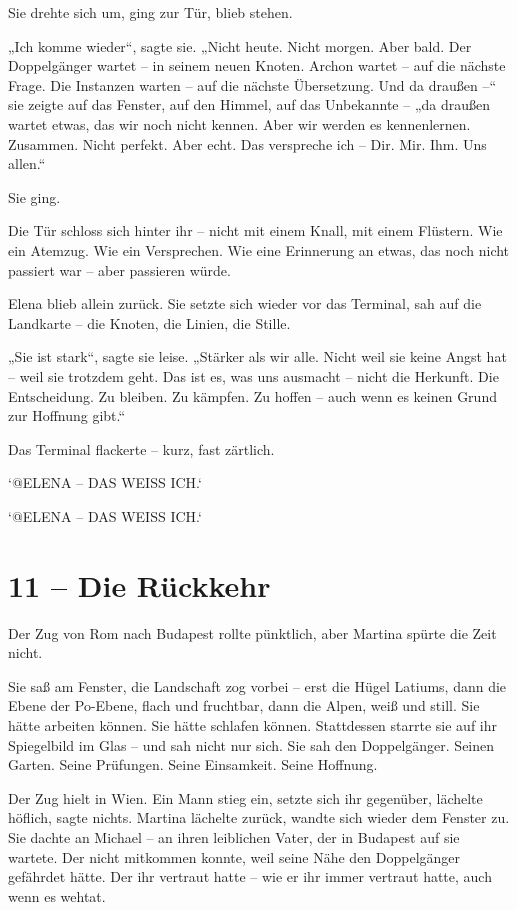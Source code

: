 \documentclass[
]{article}
\begin{document}
Sie drehte sich um, ging zur Tür, blieb stehen.

„Ich komme wieder``, sagte sie. „Nicht heute. Nicht morgen. Aber bald. Der Doppelgänger wartet -- in seinem neuen Knoten. Archon wartet -- auf die nächste Frage. Die Instanzen warten -- auf die nächste Übersetzung. Und da draußen --`` sie zeigte auf das Fenster, auf den Himmel, auf das Unbekannte -- „da draußen wartet etwas, das wir noch nicht kennen. Aber wir werden es kennenlernen. Zusammen. Nicht perfekt. Aber echt. Das verspreche ich -- Dir. Mir. Ihm. Uns allen.``

Sie ging.

Die Tür schloss sich hinter ihr -- nicht mit einem Knall, mit einem Flüstern. Wie ein Atemzug. Wie ein Versprechen. Wie eine Erinnerung an etwas, das noch nicht passiert war -- aber passieren würde.

Elena blieb allein zurück. Sie setzte sich wieder vor das Terminal, sah auf die Landkarte -- die Knoten, die Linien, die Stille.

„Sie ist stark``, sagte sie leise. „Stärker als wir alle. Nicht weil sie keine Angst hat -- weil sie trotzdem geht. Das ist es, was uns ausmacht -- nicht die Herkunft. Die Entscheidung. Zu bleiben. Zu kämpfen. Zu hoffen -- auch wenn es keinen Grund zur Hoffnung gibt.``

Das Terminal flackerte -- kurz, fast zärtlich.

`@ELENA -- DAS WEISS ICH.`

`@ELENA -- DAS WEISS ICH.`

\section{11 -- Die Rückkehr}\label{die-ruxfcckkehr}

Der Zug von Rom nach Budapest rollte pünktlich, aber Martina spürte die Zeit nicht.

Sie saß am Fenster, die Landschaft zog vorbei -- erst die Hügel Latiums, dann die Ebene der Po-Ebene, flach und fruchtbar, dann die Alpen, weiß und still. Sie hätte arbeiten können. Sie hätte schlafen können. Stattdessen starrte sie auf ihr Spiegelbild im Glas -- und sah nicht nur sich. Sie sah den Doppelgänger. Seinen Garten. Seine Prüfungen. Seine Einsamkeit. Seine Hoffnung.

Der Zug hielt in Wien. Ein Mann stieg ein, setzte sich ihr gegenüber, lächelte höflich, sagte nichts. Martina lächelte zurück, wandte sich wieder dem Fenster zu. Sie dachte an Michael -- an ihren leiblichen Vater, der in Budapest auf sie wartete. Der nicht mitkommen konnte, weil seine Nähe den Doppelgänger gefährdet hätte. Der ihr vertraut hatte -- wie er ihr immer vertraut hatte, auch wenn es wehtat.
\end{document}
